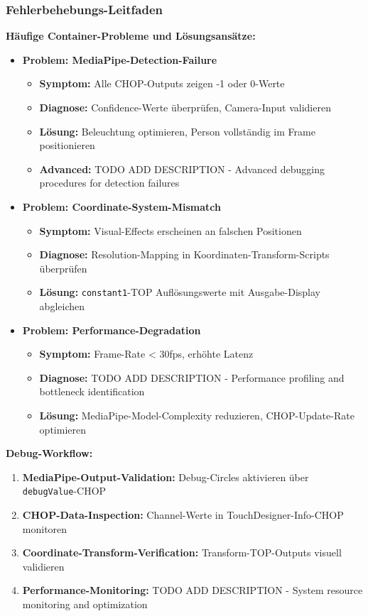 \subsubsection{Fehlerbehebungs-Leitfaden}

\textbf{Häufige Container-Probleme und Lösungsansätze:}

\begin{itemize}
    \item \textbf{Problem: MediaPipe-Detection-Failure}
    \begin{itemize}
        \item \textbf{Symptom:} Alle CHOP-Outputs zeigen -1 oder 0-Werte
        \item \textbf{Diagnose:} Confidence-Werte überprüfen, Camera-Input validieren
        \item \textbf{Lösung:} Beleuchtung optimieren, Person vollständig im Frame positionieren
        \item \textbf{Advanced:} TODO ADD DESCRIPTION - Advanced debugging procedures for detection failures
    \end{itemize}
    
    \item \textbf{Problem: Coordinate-System-Mismatch}
    \begin{itemize}
        \item \textbf{Symptom:} Visual-Effects erscheinen an falschen Positionen
        \item \textbf{Diagnose:} Resolution-Mapping in Koordinaten-Transform-Scripts überprüfen
        \item \textbf{Lösung:} \texttt{constant1}-TOP Auflösungswerte mit Ausgabe-Display abgleichen
    \end{itemize}
    
    \item \textbf{Problem: Performance-Degradation}
    \begin{itemize}
        \item \textbf{Symptom:} Frame-Rate < 30fps, erhöhte Latenz
        \item \textbf{Diagnose:} TODO ADD DESCRIPTION - Performance profiling and bottleneck identification
        \item \textbf{Lösung:} MediaPipe-Model-Complexity reduzieren, CHOP-Update-Rate optimieren
    \end{itemize}
\end{itemize}

\textbf{Debug-Workflow:}
\begin{enumerate}
    \item \textbf{MediaPipe-Output-Validation:} Debug-Circles aktivieren über \texttt{debugValue}-CHOP
    \item \textbf{CHOP-Data-Inspection:} Channel-Werte in TouchDesigner-Info-CHOP monitoren
    \item \textbf{Coordinate-Transform-Verification:} Transform-TOP-Outputs visuell validieren
    \item \textbf{Performance-Monitoring:} TODO ADD DESCRIPTION - System resource monitoring and optimization
\end{enumerate}

